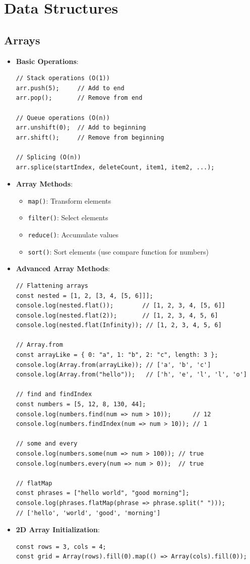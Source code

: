 \documentclass{article}
\begin{document}
\section{Data Structures}

\subsection{Arrays}
\begin{itemize}
    \item \textbf{Basic Operations}:
    \begin{lstlisting}
// Stack operations (O(1))
arr.push(5);     // Add to end
arr.pop();       // Remove from end

// Queue operations (O(n))
arr.unshift(0);  // Add to beginning
arr.shift();     // Remove from beginning

// Splicing (O(n))
arr.splice(startIndex, deleteCount, item1, item2, ...);
    \end{lstlisting}
    
    \item \textbf{Array Methods}:
    \begin{itemize}
        \item \texttt{map()}: Transform elements
        \item \texttt{filter()}: Select elements
        \item \texttt{reduce()}: Accumulate values
        \item \texttt{sort()}: Sort elements (use compare function for numbers)
    \end{itemize}
    
    \item \textbf{Advanced Array Methods}:
    \begin{lstlisting}
// Flattening arrays
const nested = [1, 2, [3, 4, [5, 6]]];
console.log(nested.flat());        // [1, 2, 3, 4, [5, 6]]
console.log(nested.flat(2));       // [1, 2, 3, 4, 5, 6]
console.log(nested.flat(Infinity)); // [1, 2, 3, 4, 5, 6]

// Array.from
const arrayLike = { 0: "a", 1: "b", 2: "c", length: 3 };
console.log(Array.from(arrayLike)); // ['a', 'b', 'c']
console.log(Array.from("hello"));   // ['h', 'e', 'l', 'l', 'o']

// find and findIndex
const numbers = [5, 12, 8, 130, 44];
console.log(numbers.find(num => num > 10));      // 12
console.log(numbers.findIndex(num => num > 10)); // 1

// some and every
console.log(numbers.some(num => num > 100)); // true
console.log(numbers.every(num => num > 0));  // true

// flatMap
const phrases = ["hello world", "good morning"];
console.log(phrases.flatMap(phrase => phrase.split(" "))); 
// ['hello', 'world', 'good', 'morning']
    \end{lstlisting}
    
    \item \textbf{2D Array Initialization}:
    \begin{lstlisting}
const rows = 3, cols = 4;
const grid = Array(rows).fill(0).map(() => Array(cols).fill(0));
    \end{lstlisting}
\end{itemize}
\end{document}
